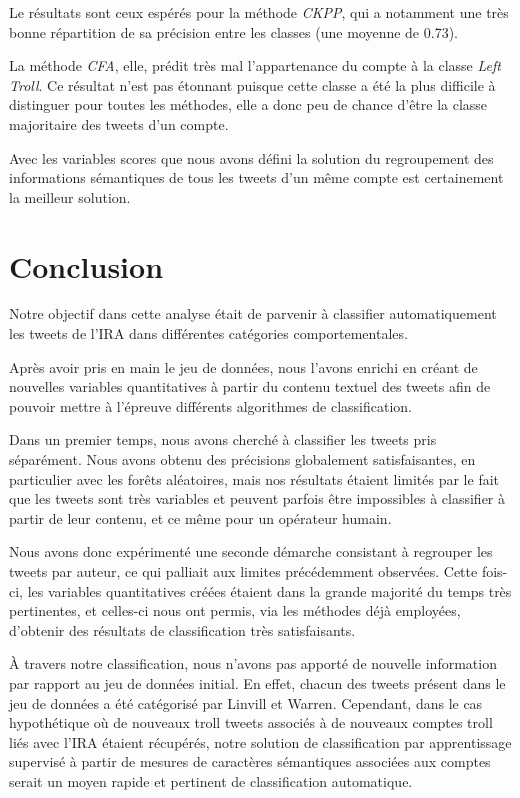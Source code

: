 \documentclass[twocolumn,10pt]{article}
\begin{document}
Le résultats sont ceux espérés pour la méthode \textit{CKPP}, qui a notamment une très bonne répartition de sa précision entre les classes (une moyenne de 0.73).

La méthode \textit{CFA}, elle, prédit très mal l'appartenance du compte à la classe \textit{Left Troll}. Ce résultat n'est pas étonnant puisque cette classe a été la plus difficile à distinguer pour toutes les méthodes, elle a donc peu de chance d'être la classe majoritaire des tweets d'un compte.

Avec les variables scores que nous avons défini la solution du regroupement des informations sémantiques de tous les tweets d'un même compte est certainement la meilleur solution.


\section{Conclusion}\label{sec:conclusion}

Notre objectif dans cette analyse était de parvenir à classifier automatiquement les tweets de l'IRA dans différentes catégories comportementales.

Après avoir pris en main le jeu de données, nous l'avons enrichi en créant de nouvelles variables quantitatives à partir du contenu textuel des tweets afin de pouvoir mettre à l'épreuve différents algorithmes de classification.
 
Dans un premier temps, nous avons cherché à classifier les tweets pris séparément. Nous avons obtenu des précisions globalement satisfaisantes, en particulier avec les forêts aléatoires, mais nos résultats étaient limités par le fait que les tweets sont très variables et peuvent parfois être impossibles à classifier à partir de leur contenu, et ce même pour un opérateur humain.

Nous avons donc expérimenté une seconde démarche consistant à regrouper les tweets par auteur, ce qui palliait aux limites précédemment observées. Cette fois-ci, les variables quantitatives créées étaient dans la grande majorité du temps très pertinentes, et celles-ci nous ont permis, via les méthodes déjà employées, d'obtenir des résultats de classification très satisfaisants.

À travers notre classification, nous n'avons pas apporté de nouvelle information par rapport au jeu de données initial. En effet, chacun des tweets présent dans le jeu de données a été catégorisé par Linvill et Warren. Cependant, dans le cas hypothétique où de nouveaux troll tweets associés à de nouveaux comptes troll liés avec l'IRA étaient récupérés, notre solution de classification par apprentissage supervisé à partir de mesures de caractères sémantiques associées aux comptes serait un moyen rapide et pertinent de classification automatique.
\end{document}
